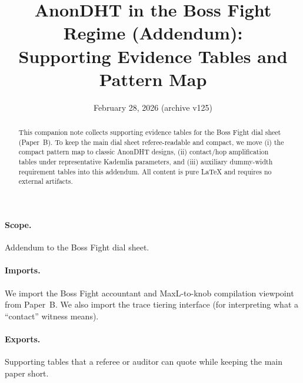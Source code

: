 \documentclass[11pt]{article}
\title{AnonDHT in the Boss Fight Regime (Addendum):\\Supporting Evidence Tables and Pattern Map}
\author{}
\date{February 28, 2026 (archive v125)}
\begin{document}
\maketitle

\begin{abstract}
This companion note collects supporting evidence tables for the Boss Fight dial sheet (Paper~B).
To keep the main dial sheet referee-readable and compact, we move (i) the compact pattern map to classic AnonDHT designs,
(ii) contact/hop amplification tables under representative Kademlia parameters, and (iii) auxiliary dummy-width requirement tables into this addendum.
All content is pure \LaTeX{} and requires no external artifacts.
\end{abstract}

\paragraph{Scope.}
Addendum to the Boss Fight dial sheet.\cite{series:bossfightB}

\paragraph{Imports.}
We import the Boss Fight accountant and MaxL-to-knob compilation viewpoint from Paper~B.\cite{series:bossfightB}
We also import the trace tiering interface (for interpreting what a ``contact'' witness means).\cite{series:traceifaces}

\paragraph{Exports.}
Supporting tables that a referee or auditor can quote while keeping the main paper short.
\end{document}
